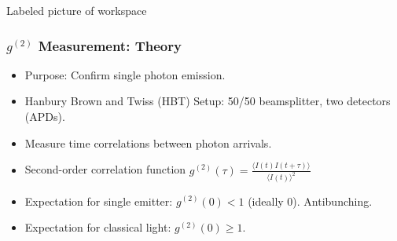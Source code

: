 \begin{frame}{Labeled picture of workspace}
    
\end{frame}


\begin{frame}
\frametitle{$g^{(2)}$ Measurement: Theory}
\begin{itemize}
    \item Purpose: Confirm single photon emission.
    \item Hanbury Brown and Twiss (HBT) Setup: 50/50 beamsplitter, two detectors (APDs).
    \item Measure time correlations between photon arrivals.
    \item Second-order correlation function $g^{(2)}(\tau) = \frac{\langle I(t)I(t+\tau) \rangle}{\langle I(t) \rangle^2}$
    \item Expectation for single emitter: $g^{(2)}(0) < 1$ (ideally 0). Antibunching.
    \item Expectation for classical light: $g^{(2)}(0) \ge 1$.
\end{itemize}
\end{frame}

